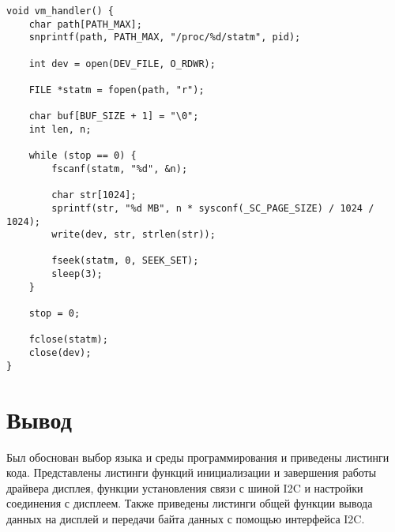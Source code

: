 \begin{lstlisting}[label=lst:proc,caption=Реализация функции-обработчика запроса пользователя для вывода из proc данных о потребляемой процессом виртуальной памяти]
void vm_handler() {
    char path[PATH_MAX];
    snprintf(path, PATH_MAX, "/proc/%d/statm", pid);

    int dev = open(DEV_FILE, O_RDWR);

    FILE *statm = fopen(path, "r");

    char buf[BUF_SIZE + 1] = "\0";
    int len, n;

    while (stop == 0) {
        fscanf(statm, "%d", &n);

        char str[1024];
        sprintf(str, "%d MB", n * sysconf(_SC_PAGE_SIZE) / 1024 / 1024);
        write(dev, str, strlen(str));

        fseek(statm, 0, SEEK_SET);
        sleep(3);
    }

    stop = 0;

    fclose(statm);
    close(dev);
}
\end{lstlisting}

\section*{Вывод}
Был обоснован выбор языка и среды программирования и приведены листинги кода. Представлены листинги функций инициализации и завершения работы драйвера дисплея, функции установления связи с шиной I2C и настройки соединения с дисплеем. Также приведены листинги общей функции вывода данных на дисплей и передачи байта данных с помощью интерфейса I2C.






